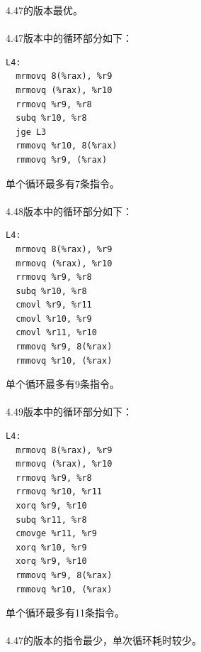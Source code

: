 \documentclass[11pt]{article}
\begin{document}
4.47的版本最优。\\\\
4.47版本中的循环部分如下：
\begin{lstlisting}[language={[x86masm]Assembler}]
L4:
  mrmovq 8(%rax), %r9
  mrmovq (%rax), %r10
  rrmovq %r9, %r8
  subq %r10, %r8
  jge L3
  rmmovq %r10, 8(%rax)
  rmmovq %r9, (%rax)
\end{lstlisting}
单个循环最多有7条指令。\\\\
4.48版本中的循环部分如下：
\begin{lstlisting}[language={[x86masm]Assembler}]
L4:
  mrmovq 8(%rax), %r9
  mrmovq (%rax), %r10
  rrmovq %r9, %r8
  subq %r10, %r8
  cmovl %r9, %r11
  cmovl %r10, %r9
  cmovl %r11, %r10
  rmmovq %r9, 8(%rax)
  rmmovq %r10, (%rax)
\end{lstlisting}
单个循环最多有9条指令。\\\\
4.49版本中的循环部分如下：
\begin{lstlisting}[language={[x86masm]Assembler}]
L4:
  mrmovq 8(%rax), %r9
  mrmovq (%rax), %r10
  rrmovq %r9, %r8
  rrmovq %r10, %r11
  xorq %r9, %r10
  subq %r11, %r8
  cmovge %r11, %r9
  xorq %r10, %r9
  xorq %r9, %r10
  rmmovq %r9, 8(%rax)
  rmmovq %r10, (%rax)
\end{lstlisting}
单个循环最多有11条指令。\\\\
4.47的版本的指令最少，单次循环耗时较少。
\end{document}
